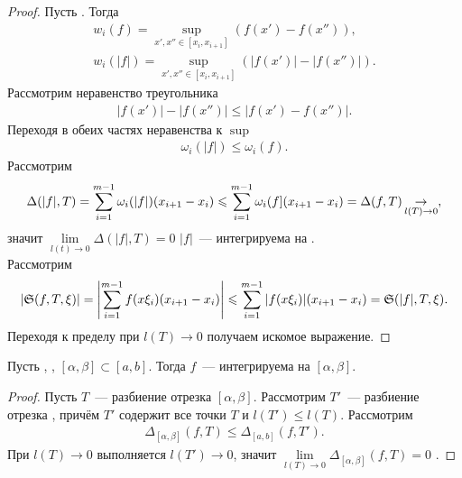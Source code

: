 \documentclass[../main.tex]{subfiles}
\begin{document}
\begin{proof}
    Пусть \tpab. Тогда 
    \begin{gather*}
        w_i(f) = \sup_{x',x'' \in [x_i,x_{i+1}]}(f(x') - f(x'')), \\
        w_i(|f|) = \sup_{x',x'' \in [x_i,x_{i+1}]}(|f(x')| - |f(x'')|).
    \end{gather*}
    Рассмотрим неравенство треугольника 
    \begin{gather*}
        |f(x')| - |f(x'')| \leq |f(x') - f(x'')|. 
    \end{gather*}
    Переходя в обеих частях неравенства к $\sup$
    \begin{gather*}
        \omega_i(|f|) \leq \omega_i(f). 
    \end{gather*}
    Рассмотрим 
    \begin{gather*}
        \Delta (|f|, T) = \sum_{i=1}^{m-1} \omega_i(|f|)(x_{i+1} - x_i) \leqslant \sum_{i=1}^{m-1} \omega_i(f](x_{i+1} - x_i) = \Delta (f, T) \operatorname*{\to}_{l(T) \to 0},
    \end{gather*}
    значит $\lim \limits_{l(t)\to 0} \Delta (|f|, T) = 0$ \hence  $|f|$~--- интегрируема на \segab. \\
    Рассмотрим 
    \begin{gather*}
        |\mathfrak{S}(f, T, \xi)| = \left|\sum_{i=1}^{m-1}f(x\xi_i)(x_{i+1} - x_i)\right| \leqslant \sum_{i=1}^{m-1}|f(x\xi_i)|(x_{i+1} - x_i) = \mathfrak{S}(|f|, T, \xi).
    \end{gather*}
    Переходя к пределу при $l(T) \to 0$ получаем искомое выражение.
\end{proof}

\begin{proposition}
    Пусть \fabr, \fintonab, $[\alpha,\beta] \subset [a,b]$. Тогда $f$~--- интегрируема на $[\alpha,\beta]$.
\end{proposition}

\begin{proof}
    Пусть $T$~--- разбиение отрезка $[\alpha,\beta]$. Рассмотрим $T'$~--- разбиение отрезка \segab, причём $T'$ содержит все точки $T$ и $l(T') \leq l(T)$.
    Рассмотрим 
    \begin{gather*}
        \Delta_{[\alpha,\beta]} (f, T) \leq \Delta_{[a,b]} (f, T').
    \end{gather*}
    При $l(T) \to 0$ выполняется $l(T') \to 0$, значит $\lim\limits_{l(T) \to 0} \Delta_{[\alpha,\beta]} (f, T) = 0$ \hence \fintonab.
\end{proof}
\end{document}
